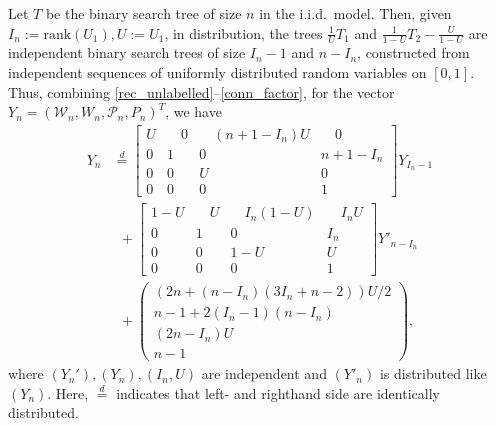 \documentclass{amsart}       %
\newcommand{\Ew}{\ensuremath{\mathcal P}}
\newcommand{\Ww}{\ensuremath{\mathcal W}}
\begin{document}
Let $T$ be the  binary search tree of size $n$ in the i.i.d.\ model. Then, given $I_n := \text{rank}(U_1), U := U_1$, in distribution, the trees $\frac{1}{U} T_1$ and $\frac{1}{1-U} T_2 - \frac{U}{1-U}$ are independent binary search trees of size $I_n - 1$ and $n- I_n$, constructed from
independent sequences of uniformly distributed random variables on $[0,1]$. Thus, combining \eqref{rec_unlabelled}--\eqref{conn_factor}, for the vector
$Y_n = (\Ww_n, W_n,\Ew_n,P_n)^T$, we have
\begin{align*}
 Y_n&\stackrel{d}{=} \left[\begin{array}{cccc} U &\quad 0&\quad (n+1-I_n)U&\quad 0 \\0 & 1& 0&
n+1-I_n\\0 & 0& U& 0\\0 & 0& 0& 1
\end{array}\right]Y_{I_n-1}\nonumber\\
& \: \:+ \left[\begin{array}{cccc} 1-U &\quad U&\quad I_n(1-U)&\quad I_nU
\\0 & 1& 0& I_n\\0 & 0& 1-U& U\\0 & 0& 0& 1
\end{array}\right] Y'_{n-I_n} \\
& \: \: +\left(\begin{array}{cccc}
(2n + (n-I_n)(3 I_n + n - 2))U/2\\n-1+2(I_n-1)(n-I_n)\\(2n - I_n)U\\n-1
\end{array}\right),
\end{align*}
where $(Y_n'), (Y_n), (I_n, U)$ are independent and $(Y'_n)$ is distributed like $(Y_n)$. Here, $\stackrel{d}{=}$ indicates that left- and righthand side are identically distributed.
\end{document}
